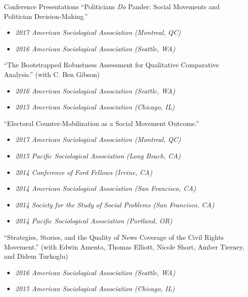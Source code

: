 \begin{rSection}{Conference Presentations}
``Politicians \textit{Do} Pander: Social Movements and Politician Decision-Making.''
\vspace*{-.75em} 
\begin{itemize}[leftmargin=.25in] 
\item {\footnotesize \it 2017 American Sociological Association (Montreal, QC)}\vspace*{-.75em} 
\item {\footnotesize \it 2016 American Sociological Association (Seattle, WA)}
\end{itemize} 

``The Bootstrapped Robustness Assessment for Qualitative Comparative Analysis.'' ({\footnotesize with C. Ben Gibson})
\vspace*{-.75em} 
\begin{itemize}[leftmargin=.25in] 
\item {\footnotesize \it 2016 American Sociological Association (Seattle, WA)}\vspace*{-.75em} 
\item {\footnotesize \it 2015 American Sociological Association (Chicago, IL)}
\end{itemize} 

``Electoral Counter-Mobilization as a Social Movement Outcome.''
\vspace*{-.75em} 
\begin{itemize}[leftmargin=.25in] 
\item {\footnotesize \it 2017 American Sociological Association (Montreal, QC)}\vspace*{-.75em} 
\item {\footnotesize \it 2015 Pacific Sociological Association (Long Beach, CA)}\vspace*{-.75em} 
\item {\footnotesize \it 2014 Conference of Ford Fellows (Irvine, CA)}\vspace*{-.75em} 
\item {\footnotesize \it 2014 American Sociological Association (San Francisco, CA)}\vspace*{-.75em} 
\item {\footnotesize \it 2014 Society for the Study of Social Problems (San Francisco, CA)}\vspace*{-.75em} 
\item {\footnotesize \it 2014 Pacific Sociological Association (Portland, OR)}
\end{itemize} 

``Strategies, Stories, and the Quality of News Coverage of the Civil Rights Movement.'' ({\footnotesize with Edwin Amenta, Thomas Elliott, Nicole Short, Amber Tierney, and Didem Turkoglu})
\vspace*{-.75em} 
\begin{itemize}[leftmargin=.25in] 
\item {\footnotesize \it 2016 American Sociological Association (Seattle, WA)}\vspace*{-.75em} 
\item {\footnotesize \it 2015 American Sociological Association (Chicago, IL)}
\end{itemize} 


\end{rSection}
